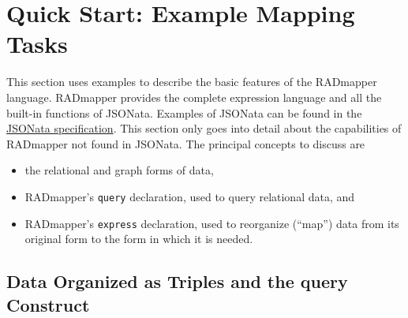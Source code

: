 \documentclass[9pt,letterpaper]{article}
\newcommand{\stt}[1]{\texttt{#1}} %
\begin{document}


\section{Quick Start: Example Mapping Tasks}

This section uses examples to describe the basic features of the RADmapper language.
RADmapper provides the complete expression language and all the built-in functions of JSONata.
Examples of JSONata can be found in the \href{https://jsonata.org/}{JSONata specification}.
This section only goes into detail about the capabilities of RADmapper not found in JSONata.
The principal concepts to discuss are

\begin{itemize}
  \item{the relational and graph forms of data,}
  \item{RADmapper's \stt{query} declaration, used to query relational data, and }
  \item{RADmapper's \stt{express} declaration, used to reorganize (``map'') data from its original form to the form in which it is needed.}
\end{itemize}


\subsection{Data Organized as Triples and the query Construct}
\end{document}

